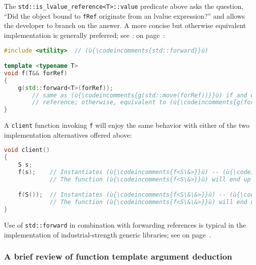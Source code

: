 \noindent The \texttt{std::is\_lvalue\_reference<T>::value} predicate above asks
the question, ``Did the object bound to \texttt{fRef} originate
from an lvalue expression?'' and allows the developer to branch on the
answer. A more concise but otherwise equivalent implementation is
generally preferred; see \textit{: } on page~\pageref{the-std::forward-utility}:

\begin{lstlisting}[language=C++]
#include <utility>  // (ù{\codeincomments{std::forward}}ù)

template <typename T>
void f(T&& forRef)
{
    g(std::forward<T>(forRef));
        // same as (ù{\codeincomments{g(std::move(forRef))}}ù) if and only if (ù{\codeincomments{forRef}}ù) is an *rvalue*
        // reference; otherwise, equivalent to (ù{\codeincomments{g(forRef)}}ù)
}
\end{lstlisting}

\noindent A \texttt{client} function invoking \texttt{f} will enjoy the same
behavior with either of the two implementation alternatives offered
above:

\begin{lstlisting}[language=C++]
void client()
{
    S s;
    f(s);    // Instantiates (ù{\codeincomments{f<S\&>}}ù) -- (ù{\codeincomments{fRef}}ù) is an lvalue reference ((ù{\codeincomments{S\&}}ù)).
             // The function (ù{\codeincomments{f<S\&>}}ù) will end up invoking (ù{\codeincomments{g(S\&)}}ù).

    f(S());  // Instantiates (ù{\codeincomments{f<S\&\&>}}ù) -- (ù{\codeincomments{fRef}}ù) is an rvalue reference ((ù{\codeincomments{S\&\&}}ù)).
             // The function (ù{\codeincomments{f<S\&\&>}}ù) will end up invoking (ù{\codeincomments{g(S\&\&)}}ù).
}
\end{lstlisting}

\noindent Use of \texttt{std::forward} in combination with forwarding references
is typical in the implementation of industrial-strength generic
libraries; see \textit{} on page~\pageref{use-cases-forwardingref}.

\subsubsection[A brief review of function template argument deduction]{A brief review of function template argument deduction}\label{a-brief-review-of-function-template-argument-deduction}

